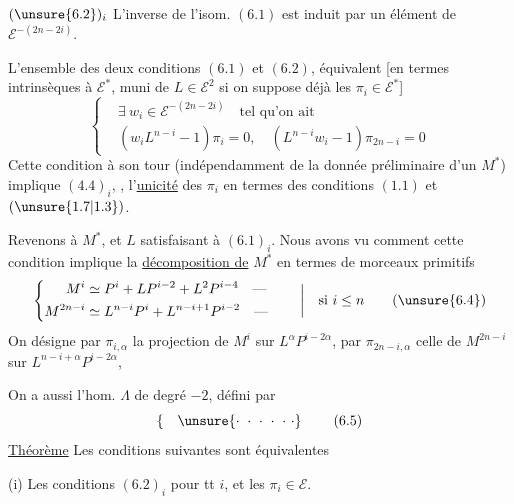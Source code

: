 $(\unsure{6.2})_i$ L'inverse de l'isom. $(6.1)$ est  induit par un élément de $\mathcal E^{-(2n-2i)}$.

 L'ensemble des deux conditions $(6.1)$ et $(6.2)$, équivalent [en termes intrinsèques à $\mathcal E^*$, muni de $L\in\mathcal E^2$ si on suppose déjà les $\pi_i\in\mathcal E^*$]
\[
\left\{\begin{aligned}
&\exists\ w_i\in\mathcal E^{-(2n-2i)}\quad\text{tel qu'on ait}\\
&(w_iL^{n-i}-1)\pi_i=0,\quad(L^{n-i}w_i-1)\pi_{2n-i}=0
\end{aligned}\right.
\tag*{$(6.3.)_i$}
\]
Cette condition à son tour (indépendamment de la donnée préliminaire d'un $M^*$) implique $(4.4)_i$, ,  l'\uline{unicité} des $\pi_i$ en termes des conditions $(1.1)$ et $(\unsure{1.7|1.3})$.

Revenons à $M^*$, et $L$ satisfaisant à $(6.1)_i$. Nous avons vu comment  cette condition implique la \uline{décomposition de} $M^*$ en termes  de morceaux primitifs
\[
\left\{\begin{aligned}
M^i&\simeq P^i+LP^{i-2}+L^2P^{i-4}\quad\text{---}\\
M^{2n-i}&\simeq L^{n-i}P^i+L^{n-i+1}P^{i-2}\quad\text{---}
\end{aligned}\right.\qquad\bigg|\quad\text{si }i\leq n
\tag{\unsure{6.4}}
\]
On désigne par $\pi_{i,\alpha}$ la projection de $M^i$ sur $L^\alpha P^{i-2\alpha}$, par $\pi_{2n-i,\alpha}$ celle de $M^{2n-i}$ sur $L^{n-i+\alpha}P^{i-2\alpha}$,

On a aussi l'hom. $\Lambda$ de degré $-2$, défini par
\[
\left\{\quad\unsure{\cdot\ \cdot\ \cdot\ \cdot\ \cdot\ \cdot}\right.
\tag{6.5}
\]
\uline{Théorème} Les conditions suivantes  sont équivalentes

(i) Les conditions  $(6.2)_i$ pour tt $i$, et les $\pi_i\in\mathcal E$.

